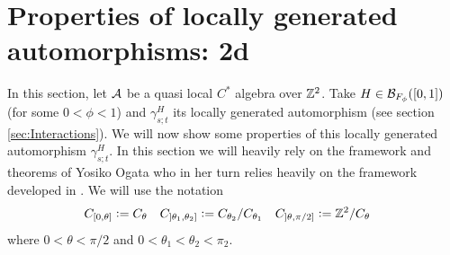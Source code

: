 \documentclass[12pt,a4paper,twoside]{article}
\numberwithin{equation}{section}
\begin{document}
\section{Properties of locally generated automorphisms: 2d}
In this section, let $\AA$ be a quasi local $C^*$ algebra over $\ZZ^2$. Take $H\in\BB_{F_\phi}([0,1])$ (for some $0<\phi<1$) and $\gamma^H_{s;t}$ its locally generated automorphism (see section \ref{sec:Interactions}). We will now show some properties of this locally generated automorphism $\gamma^H_{s;t}$. In this section we will heavily rely on the framework and theorems of Yosiko Ogata \cite{ogata2021h3gmathbb} who in her turn relies heavily on the framework developed in \cite{doi:10.1063/1.5095769}. We will use the notation
\begin{align}
	C_{[0,\theta]}&\defeq C_{\theta}&C_{]\theta_1,\theta_2]}&\defeq C_{\theta_2}/C_{\theta_1}&C_{]\theta,\pi/2]}&\defeq \ZZ^2/C_{\theta}
\end{align}
where $0<\theta<\pi/2$ and $0<\theta_1<\theta_2<\pi_2$.
\end{document}
